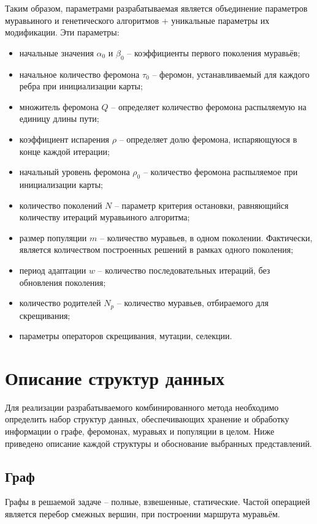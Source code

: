 Таким образом, параметрами разрабатываемая является объединение параметров муравьиного и генетического алгоритмов + уникальные параметры их модификации. Эти параметры:
\begin{itemize}
	\item начальные значения $\alpha_0$ и $\beta_0$ -- коэффициенты первого поколения муравьёв;
	\item начальное количество феромона $\tau_0$ -- феромон, устанавливаемый для каждого ребра при инициализации карты;
	\item множитель феромона $Q$ -- определяет количество феромона распыляемую на единицу длины пути;
	\item коэффициент испарения $\rho$ -- определяет долю феромона, испаряющуюся в конце каждой итерации;
	\item начальный уровень феромона $\rho_0$ -- количество феромона распыляемое при инициализации карты;
	\item количество поколений $N$ -- параметр критерия остановки, равняющийся количеству итераций муравьиного алгоритма;
	\item размер популяции $m$ -- количество муравьев, в одном поколении. Фактически, является количеством построенных решений в рамках одного поколения;
	\item период адаптации $w$ -- количество последовательных итераций, без обновления поколения; 
	\item количество родителей $N_p$ -- количество муравьев, отбираемого для скрещивания;
	\item параметры операторов скрещивания, мутации, селекции.
\end{itemize}


\section{Описание структур данных}

Для реализации разрабатываемого комбинированного метода необходимо определить набор структур данных, обеспечивающих хранение и обработку информации о графе, феромонах, муравьях и популяции в целом. Ниже приведено описание каждой структуры и обоснование выбранных представлений.

\subsection{Граф}

Графы в решаемой задаче -- полные, взвешенные, статические. Частой операцией является перебор смежных вершин, при построении маршрута муравьём.

